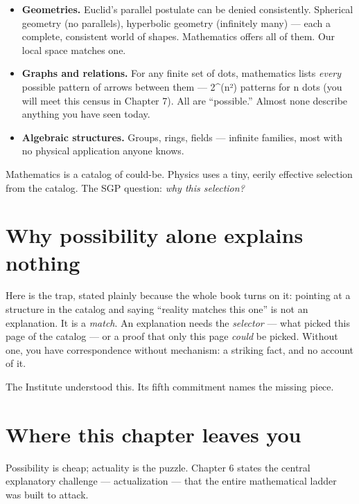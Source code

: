 \documentclass[
  11pt,
]{book}
\providecommand{\tightlist}{%
  \setlength{\itemsep}{0pt}\setlength{\parskip}{0pt}}
\begin{document}
\begin{itemize}
\tightlist
\item
  \textbf{Geometries.} Euclid's parallel postulate can be denied
  consistently. Spherical geometry (no parallels), hyperbolic geometry
  (infinitely many) --- each a complete, consistent world of shapes.
  Mathematics offers all of them. Our local space matches one.
\item
  \textbf{Graphs and relations.} For any finite set of dots, mathematics
  lists \emph{every} possible pattern of arrows between them ---
  2\^{}(n²) patterns for n dots (you will meet this census in Chapter
  7). All are ``possible.'' Almost none describe anything you have seen
  today.
\item
  \textbf{Algebraic structures.} Groups, rings, fields --- infinite
  families, most with no physical application anyone knows.
\end{itemize}

Mathematics is a catalog of could-be. Physics uses a tiny, eerily
effective selection from the catalog. The SGP question: \emph{why this
selection?}

\section{Why possibility alone explains
nothing}\label{why-possibility-alone-explains-nothing}

Here is the trap, stated plainly because the whole book turns on it:
pointing at a structure in the catalog and saying ``reality matches this
one'' is not an explanation. It is a \emph{match}. An explanation needs
the \emph{selector} --- what picked this page of the catalog --- or a
proof that only this page \emph{could} be picked. Without one, you have
correspondence without mechanism: a striking fact, and no account of it.

The Institute understood this. Its fifth commitment names the missing
piece.

\section{Where this chapter leaves
you}\label{where-this-chapter-leaves-you-4}

Possibility is cheap; actuality is the puzzle. Chapter 6 states the
central explanatory challenge --- actualization --- that the entire
mathematical ladder was built to attack.

\newpage
\end{document}
